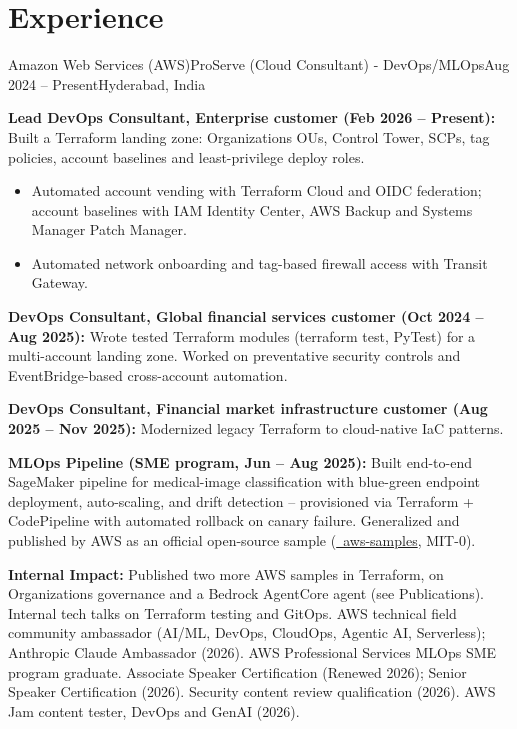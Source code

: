 \section{\textbf{Experience}}
\resumeSubHeadingListStart

\resumeExp
{Amazon Web Services (AWS)}{ProServe (Cloud Consultant) - DevOps/MLOps}{Aug 2024 -- Present}{Hyderabad, India}
\resumeItemListStart
    \item[$\diamond$] \textbf{Lead DevOps Consultant, Enterprise customer (Feb 2026 -- Present):} Built a Terraform landing zone: Organizations OUs, Control Tower, SCPs, tag policies, account baselines and least-privilege deploy roles.
    \begin{itemize}[leftmargin=2.5ex, noitemsep, topsep=0pt, labelsep=1.2mm]
        \item[$\circ$] Automated account vending with Terraform Cloud and OIDC federation; account baselines with IAM Identity Center, AWS Backup and Systems Manager Patch Manager.
        \item[$\circ$] Automated network onboarding and tag-based firewall access with Transit Gateway.
    \end{itemize}
    \item[$\diamond$] \textbf{DevOps Consultant, Global financial services customer (Oct 2024 -- Aug 2025):} Wrote tested Terraform modules (terraform test, PyTest) for a multi-account landing zone. Worked on preventative security controls and EventBridge-based cross-account automation.
    \item[$\diamond$] \textbf{DevOps Consultant, Financial market infrastructure customer (Aug 2025 -- Nov 2025):} Modernized legacy Terraform to cloud-native IaC patterns.
    \item[$\diamond$] \textbf{MLOps Pipeline (SME program, Jun -- Aug 2025):} Built end-to-end SageMaker pipeline for medical-image classification with blue-green endpoint deployment, auto-scaling, and drift detection -- provisioned via Terraform + CodePipeline with automated rollback on canary failure. Generalized and published by AWS as an official open-source sample (\href{https://github.com/aws-samples/sample-sagemaker-image-classification-mlops}{\faGithub\ aws-samples}, MIT-0).
    \item[$\diamond$] \textbf{Internal Impact:} Published two more AWS samples in Terraform, on Organizations governance and a Bedrock AgentCore agent (see Publications). Internal tech talks on Terraform testing and GitOps. AWS technical field community ambassador (AI/ML, DevOps, CloudOps, Agentic AI, Serverless); Anthropic Claude Ambassador (2026). AWS Professional Services MLOps SME program graduate. Associate Speaker Certification (Renewed 2026); Senior Speaker Certification (2026). Security content review qualification (2026). AWS Jam content tester, DevOps and GenAI (2026).
\resumeItemListEnd

